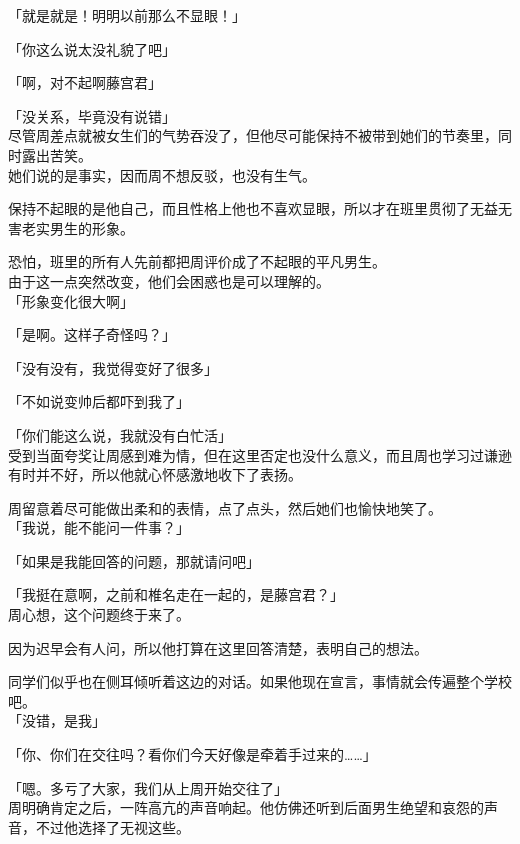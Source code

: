 「就是就是！明明以前那么不显眼！」

「你这么说太没礼貌了吧」

「啊，对不起啊藤宫君」

「没关系，毕竟没有说错」\\

尽管周差点就被女生们的气势吞没了，但他尽可能保持不被带到她们的节奏里，同时露出苦笑。\\

她们说的是事实，因而周不想反驳，也没有生气。

保持不起眼的是他自己，而且性格上他也不喜欢显眼，所以才在班里贯彻了无益无害老实男生的形象。

恐怕，班里的所有人先前都把周评价成了不起眼的平凡男生。\\

由于这一点突然改变，他们会困惑也是可以理解的。\\

「形象变化很大啊」

「是啊。这样子奇怪吗？」

「没有没有，我觉得变好了很多」

「不如说变帅后都吓到我了」

「你们能这么说，我就没有白忙活」\\

受到当面夸奖让周感到难为情，但在这里否定也没什么意义，而且周也学习过谦逊有时并不好，所以他就心怀感激地收下了表扬。

周留意着尽可能做出柔和的表情，点了点头，然后她们也愉快地笑了。\\

「我说，能不能问一件事？」

「如果是我能回答的问题，那就请问吧」

「我挺在意啊，之前和椎名走在一起的，是藤宫君？」\\

周心想，这个问题终于来了。

因为迟早会有人问，所以他打算在这里回答清楚，表明自己的想法。

同学们似乎也在侧耳倾听着这边的对话。如果他现在宣言，事情就会传遍整个学校吧。\\

「没错，是我」

「你、你们在交往吗？看你们今天好像是牵着手过来的……」

「嗯。多亏了大家，我们从上周开始交往了」\\

周明确肯定之后，一阵高亢的声音响起。他仿佛还听到后面男生绝望和哀怨的声音，不过他选择了无视这些。

